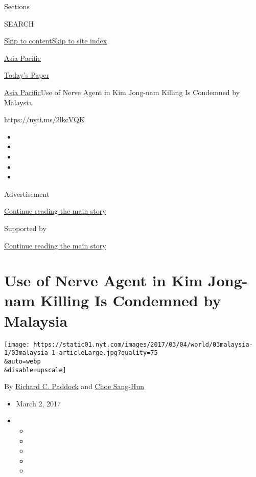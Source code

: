 Sections

SEARCH

\protect\hyperlink{site-content}{Skip to
content}\protect\hyperlink{site-index}{Skip to site index}

\href{https://www.nytimes.com/section/world/asia}{Asia Pacific}

\href{https://myaccount.nytimes.com/auth/login?response_type=cookie\&client_id=vi}{}

\href{https://www.nytimes.com/section/todayspaper}{Today's Paper}

\href{/section/world/asia}{Asia Pacific}\textbar{}Use of Nerve Agent in
Kim Jong-nam Killing Is Condemned by Malaysia

\url{https://nyti.ms/2lkcVQK}

\begin{itemize}
\item
\item
\item
\item
\item
\end{itemize}

Advertisement

\protect\hyperlink{after-top}{Continue reading the main story}

Supported by

\protect\hyperlink{after-sponsor}{Continue reading the main story}

\hypertarget{use-of-nerve-agent-in-kim-jong-nam-killing-is-condemned-by-malaysia}{%
\section{Use of Nerve Agent in Kim Jong-nam Killing Is Condemned by
Malaysia}\label{use-of-nerve-agent-in-kim-jong-nam-killing-is-condemned-by-malaysia}}

\texttt{[image: https://static01.nyt.com/images/2017/03/04/world/03malaysia-1/03malaysia-1-articleLarge.jpg?quality=75\\\&auto=webp\\\&disable=upscale]}

By \href{https://www.nytimes.com/by/richard-c-paddock}{Richard C.
Paddock} and \href{http://www.nytimes.com/by/choe-sang-hun}{Choe
Sang-Hun}

\begin{itemize}
\item
  March 2, 2017
\item
  \begin{itemize}
  \item
  \item
  \item
  \item
  \item
  \end{itemize}
\end{itemize}

